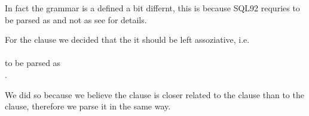 In fact the grammar is a defined a bit differnt, this is because SQL92
 requries
to be parsed as 
and not as
see  for details.

For the  clause we decided that the it should be left
assoziative, i.e. \\
 \\
to be parsed as \\
. 

We did so because we believe the  clause is closer
related to the  clause than to the 
clause, therefore we parse it in the same way.

